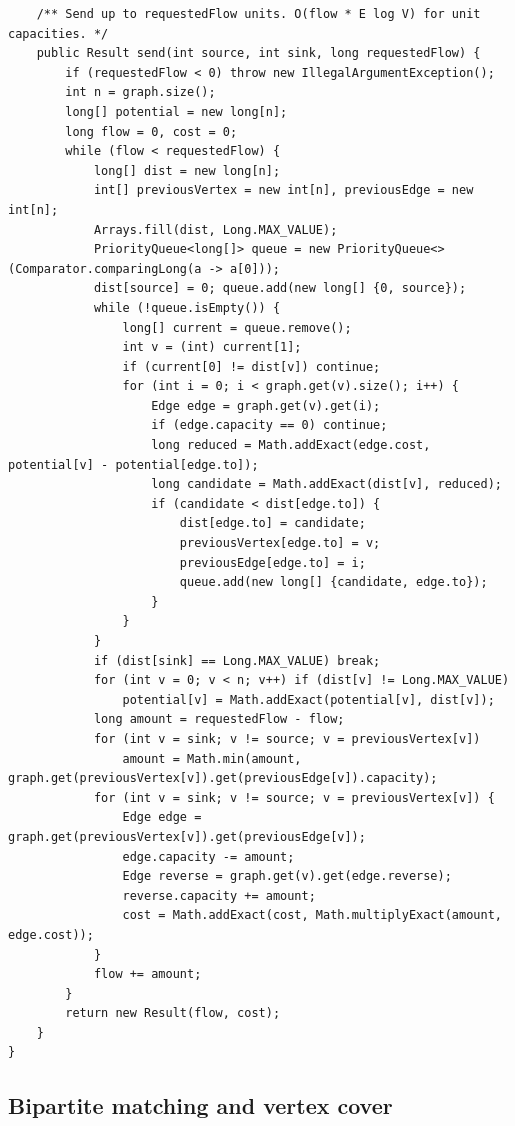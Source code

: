 \documentclass[10pt,letterpaper]{article}
\begin{document}
\begin{lstlisting}
    /** Send up to requestedFlow units. O(flow * E log V) for unit capacities. */
    public Result send(int source, int sink, long requestedFlow) {
        if (requestedFlow < 0) throw new IllegalArgumentException();
        int n = graph.size();
        long[] potential = new long[n];
        long flow = 0, cost = 0;
        while (flow < requestedFlow) {
            long[] dist = new long[n];
            int[] previousVertex = new int[n], previousEdge = new int[n];
            Arrays.fill(dist, Long.MAX_VALUE);
            PriorityQueue<long[]> queue = new PriorityQueue<>(Comparator.comparingLong(a -> a[0]));
            dist[source] = 0; queue.add(new long[] {0, source});
            while (!queue.isEmpty()) {
                long[] current = queue.remove();
                int v = (int) current[1];
                if (current[0] != dist[v]) continue;
                for (int i = 0; i < graph.get(v).size(); i++) {
                    Edge edge = graph.get(v).get(i);
                    if (edge.capacity == 0) continue;
                    long reduced = Math.addExact(edge.cost, potential[v] - potential[edge.to]);
                    long candidate = Math.addExact(dist[v], reduced);
                    if (candidate < dist[edge.to]) {
                        dist[edge.to] = candidate;
                        previousVertex[edge.to] = v;
                        previousEdge[edge.to] = i;
                        queue.add(new long[] {candidate, edge.to});
                    }
                }
            }
            if (dist[sink] == Long.MAX_VALUE) break;
            for (int v = 0; v < n; v++) if (dist[v] != Long.MAX_VALUE)
                potential[v] = Math.addExact(potential[v], dist[v]);
            long amount = requestedFlow - flow;
            for (int v = sink; v != source; v = previousVertex[v])
                amount = Math.min(amount, graph.get(previousVertex[v]).get(previousEdge[v]).capacity);
            for (int v = sink; v != source; v = previousVertex[v]) {
                Edge edge = graph.get(previousVertex[v]).get(previousEdge[v]);
                edge.capacity -= amount;
                Edge reverse = graph.get(v).get(edge.reverse);
                reverse.capacity += amount;
                cost = Math.addExact(cost, Math.multiplyExact(amount, edge.cost));
            }
            flow += amount;
        }
        return new Result(flow, cost);
    }
}
\end{lstlisting}
\subsection{Bipartite matching and vertex cover}
\end{document}
